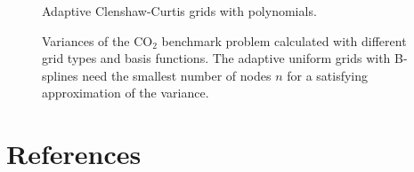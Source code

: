 \documentclass[final,hyperref={pdfpagelabels=false},table]{beamer}
\begin{document}
\begin{frame}
\begin{columns}[T]
\begin{column}{\colCWidth}
\begin{figure}[H]
\begin{minipage}[t]{.3\textwidth}
  \caption*{\centering Adaptive Clenshaw-Curtis grids with polynomials.}
\end{minipage}
  \caption{ Variances of the CO$_2$ benchmark problem calculated with different grid types and basis functions. The adaptive uniform grids with B-splines need the smallest number of nodes $n$ for a satisfying approximation of the variance.}
\end{figure}



\section{References}
\normalem %




\end{column}
\end{columns}

\end{frame}
\end{document}
